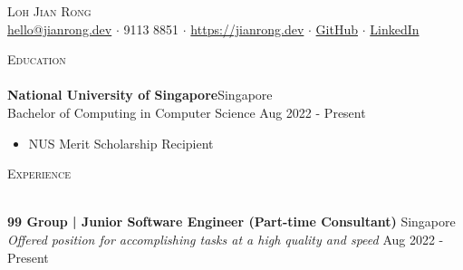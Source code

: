 \documentclass[a4paper]{article}
\newcommand{\lineunder} {
    \vspace*{-8pt} \\
    \hspace*{-12pt} \hrulefill \\
}
\newcommand{\header} [1] {
    {\hspace*{-12pt}\vspace*{6pt} \large\textsc{#1}}
    \vspace*{-6pt} \lineunder
}
\begin{document}
\vspace*{-40pt}

\begin{center}
	{\huge \scshape {Loh Jian Rong}}\\
	\href{mailto:hello@jianrong.dev}{hello@jianrong.dev} $\cdot$ 9113 8851 $\cdot$ \href{https://jianrong.dev}{https://jianrong.dev} $\cdot$ \href{https://github.com/jianrong7}{GitHub} $\cdot$ \href{https://www.linkedin.com/in/jianrong7/}{LinkedIn}\\
\end{center}

\header{Education}
\vspace{1mm}
\textbf{National University of Singapore}\hfill Singapore\\
Bachelor of Computing in Computer Science \hfill Aug 2022 - Present\\
\vspace{-2mm}
\begin{itemize} \itemsep 1pt
	\item NUS Merit Scholarship Recipient
\end{itemize}

\header{Experience}
\vspace{1mm}

\textbf{99 Group | Junior Software Engineer (Part-time Consultant)} \hfill Singapore\\
\textit{Offered position for accomplishing tasks at a high quality and speed} \hfill Aug 2022 - Present\\
\vspace{2mm}
\end{document}
